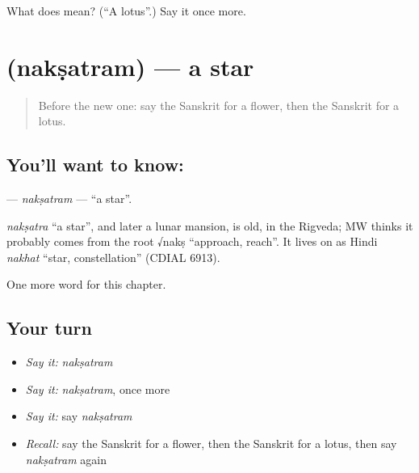 \begin{tcolorbox}[breakable,colback=teal!4,colframe=teal!35!black,title={Before you move on}]
What does  mean? (\textquotedblleft{}A lotus\textquotedblright{}.) Say it once more.
\end{tcolorbox}
\section[\texorpdfstring{\sk{नक्षत्रम्} (nakṣatram)}{नक्षत्रम् (nakṣatram)}]{ (nakṣatram) — a star}

\label{lesson:SA-C112-naksatram}



\begin{quote}
Before the new one: say the Sanskrit for a flower, then the Sanskrit for a lotus.
\end{quote}

\subsection*{You'll want to know: }
\textbf{} — \emph{nakṣatram} — \textquotedblleft{}a star\textquotedblright{}.

\begin{cousinweb}
\emph{nakṣatra} \textquotedblleft{}a star\textquotedblright{}, and later a lunar mansion, is old, in the Rigveda; MW thinks it probably comes from the root √nakṣ \textquotedblleft{}approach, reach\textquotedblright{}. It lives on as Hindi \emph{nakhat} \textquotedblleft{}star, constellation\textquotedblright{} (CDIAL 6913).
\end{cousinweb}

\begin{grammarlens}[title={What you've built}]
One more word for this chapter.
\end{grammarlens}

\subsection*{Your turn}
\begin{itemize}
\raggedright
  \item \emph{Say it:} \emph{nakṣatram}
  \item \emph{Say it:} \emph{nakṣatram}, once more
  \item \emph{Say it:} say \emph{nakṣatram}
  \item \emph{Recall:} say the Sanskrit for a flower, then the Sanskrit for a lotus, then say \emph{nakṣatram} again
\end{itemize}

